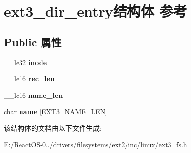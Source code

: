 \hypertarget{structext3__dir__entry}{}\section{ext3\+\_\+dir\+\_\+entry结构体 参考}
\label{structext3__dir__entry}
\subsection*{Public 属性}
\begin{DoxyCompactItemize}
\item 
\mbox{\label{structext3__dir__entry_af06195a7e71f83f852ab9974069202b6}} 
\+\_\+\+\_\+le32 {\bfseries inode}
\item 
\mbox{\label{structext3__dir__entry_ac05121a0c6cc363bfdf5eef58b178089}} 
\+\_\+\+\_\+le16 {\bfseries rec\+\_\+len}
\item 
\mbox{\label{structext3__dir__entry_a458c8473e76c62f6ead118fe81b8a00d}} 
\+\_\+\+\_\+le16 {\bfseries name\+\_\+len}
\item 
\mbox{\label{structext3__dir__entry_a24b452bbe5dc843376429199a2f73646}} 
char {\bfseries name} \mbox{[}E\+X\+T3\+\_\+\+N\+A\+M\+E\+\_\+\+L\+EN\mbox{]}
\end{DoxyCompactItemize}


该结构体的文档由以下文件生成\+:\begin{DoxyCompactItemize}
\item 
E\+:/\+React\+O\+S-\/0../drivers/filesystems/ext2/inc/linux/ext3\+\_\+fs.\+h\end{DoxyCompactItemize}
